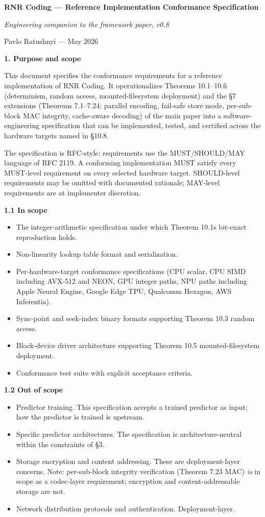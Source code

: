 \documentclass[
]{article}
\author{}
\date{}
\begin{document}
\textbf{RNR Coding --- Reference Implementation Conformance
Specification}

\emph{Engineering companion to the framework paper, v0.8}

Pavlo Ratushnyi --- May 2026

\textbf{1. Purpose and scope}

This document specifies the conformance requirements for a reference
implementation of RNR Coding. It operationalizes Theorems 10.1--10.6
(determinism, random access, mounted-filesystem deployment) and the
§7 extensions (Theorems 7.1--7.24: parallel encoding, fail-safe store
mode, per-sub-block MAC integrity, cache-aware decoding) of the main
paper into a software-engineering specification that can be
implemented, tested, and certified across the hardware targets named
in §10.8.

The specification is RFC-style: requirements use the MUST/SHOULD/MAY
language of RFC 2119. A conforming implementation MUST satisfy every
MUST-level requirement on every selected hardware target. SHOULD-level
requirements may be omitted with documented rationale; MAY-level
requirements are at implementer discretion.

\textbf{1.1 In scope}

\begin{itemize}
\item
  The integer-arithmetic specification under which Theorem
  10.1\textquotesingle s bit-exact reproduction holds.
\item
  Non-linearity lookup table format and serialization.
\item
  Per-hardware-target conformance specifications (CPU scalar, CPU SIMD
  including AVX-512 and NEON, GPU integer paths, NPU paths including
  Apple Neural Engine, Google Edge TPU, Qualcomm Hexagon, AWS
  Inferentia).
\item
  Sync-point and seek-index binary formats supporting Theorem 10.3
  random access.
\item
  Block-device driver architecture supporting Theorem 10.5
  mounted-filesystem deployment.
\item
  Conformance test suite with explicit acceptance criteria.
\end{itemize}

\textbf{1.2 Out of scope}

\begin{itemize}
\item
  Predictor training. This specification accepts a trained predictor as
  input; how the predictor is trained is upstream.
\item
  Specific predictor architectures. The specification is
  architecture-neutral within the constraints of §3.
\item
  Storage encryption and content addressing. These are deployment-layer
  concerns. Note: per-sub-block integrity verification (Theorem 7.23
  MAC) \emph{is} in scope as a codec-layer requirement; encryption and
  content-addressable storage are not.
\item
  Network distribution protocols and authentication. Deployment-layer.
\end{itemize}
\end{document}
